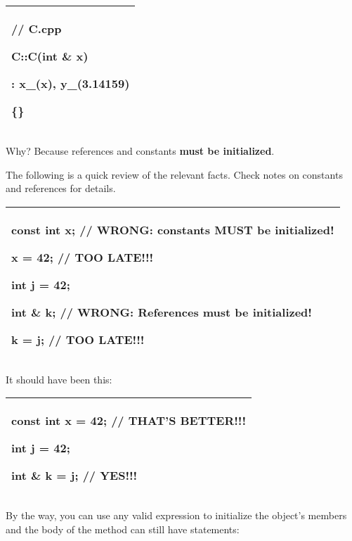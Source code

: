 \documentclass[
]{article}
\begin{document}
\begin{longtable}[]{@{}l@{}}
\toprule
\endhead
\begin{minipage}[t]{0.97\columnwidth}\raggedright
// C.cpp

C::C(int \& x)

: x\_(x), y\_(3.14159)

\{\}\strut
\end{minipage}\tabularnewline
\bottomrule
\end{longtable}

Why? Because references and constants \textbf{must be initialized}.

The following is a quick review of the relevant facts. Check notes on
constants and references for details.

\begin{longtable}[]{@{}l@{}}
\toprule
\endhead
\begin{minipage}[t]{0.97\columnwidth}\raggedright
const int x; // WRONG: constants MUST be initialized!

x = 42; // TOO LATE!!!

int j = 42;

int \& k; // WRONG: References must be initialized!

k = j; // TOO LATE!!! \strut
\end{minipage}\tabularnewline
\bottomrule
\end{longtable}

It should have been this:

\begin{longtable}[]{@{}l@{}}
\toprule
\endhead
\begin{minipage}[t]{0.97\columnwidth}\raggedright
const int x = 42; // THAT'S BETTER!!!

int j = 42;

int \& k = j; // YES!!!\strut
\end{minipage}\tabularnewline
\bottomrule
\end{longtable}

By the way, you can use any valid expression to initialize the object's
members and the body of the method can still have statements:

\begin{longtable}[]{@{}@{}}
\toprule
\endhead
\bottomrule
\end{longtable}

\begin{longtable}[]{@{}@{}}
\toprule
\endhead
\bottomrule
\end{longtable}
\end{document}
